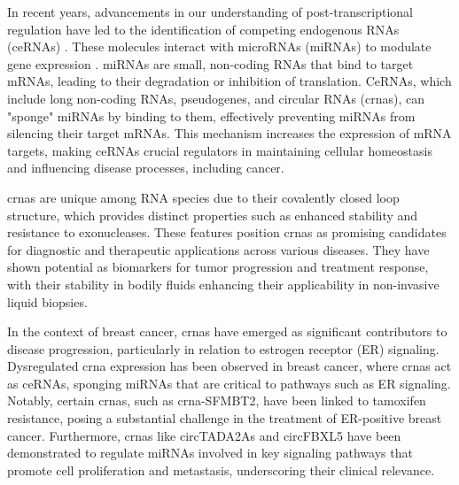 In recent years, advancements in our understanding of post-transcriptional
regulation have led to the identification of competing endogenous RNAs (ceRNAs)
\supercite{salmena_cerna_2011,tay_multilayered_2014}.
These molecules interact with microRNAs (miRNAs) to modulate gene expression
\supercite{salmena_cerna_2011,li_long_2017}.
miRNAs are small, non-coding RNAs that bind to target mRNAs,
leading to their degradation or inhibition of
translation\supercite{salmena_cerna_2011,tay_multilayered_2014}.
CeRNAs, which include long non-coding RNAs, pseudogenes, and circular RNAs
(\gls{crna}s), can "sponge" miRNAs by binding to them, effectively preventing
miRNAs from silencing their target
mRNAs\supercite{salmena_cerna_2011,poliseno_coding-independent_2010}.
This mechanism increases the expression of mRNA targets, making ceRNAs crucial
regulators in maintaining cellular homeostasis and influencing disease
processes, including cancer\supercite{salmena_cerna_2011,vo_landscape_2019}.

\Gls{crna}s are unique among RNA species due to their covalently closed loop
structure, which provides distinct properties such as enhanced stability and
resistance to exonucleases\supercite{vo_landscape_2019}.
These features position \gls{crna}s as promising candidates for diagnostic and
therapeutic applications across various
diseases\supercite{ma_circular_2020,hoque_exploring_2023,wilusz_circular_2017}.
They have shown potential as biomarkers for tumor progression and treatment
response\supercite{bao_prognostic_2020,ren_construction_2017}, with their
stability in bodily fluids enhancing their applicability in non-invasive liquid
biopsies\supercite{bao_prognostic_2020,zhang_circular_2018}.

In the context of breast cancer, \gls{crna}s have emerged as significant
contributors to disease progression, particularly in relation to estrogen
receptor (ER) signaling.
Dysregulated \gls{crna} expression has been observed in breast cancer, where
\gls{crna}s act as ceRNAs, sponging miRNAs that are critical to pathways such
as ER signaling\supercite{nair_circular_2016,xu_circrna_2022}.
Notably, certain \gls{crna}s, such as \gls{crna}-SFMBT2, have been linked to
tamoxifen resistance, posing a substantial challenge in the treatment of
ER-positive breast cancer\supercite{li_circrna-sfmbt2_2023}.
Furthermore, \gls{crna}s like circTADA2As and circFBXL5 have been demonstrated
to regulate miRNAs involved in key signaling pathways that promote cell
proliferation and metastasis, underscoring their clinical
relevance\supercite{xu_circtada2as_2019,gao_hsa_circrna_0006528_2019}.

